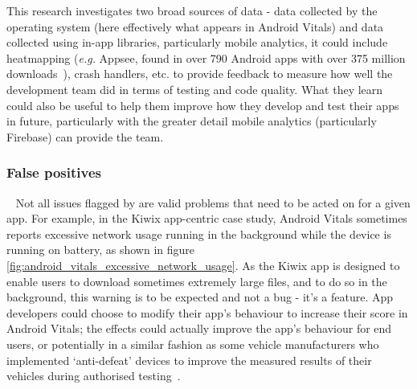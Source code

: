 This research investigates two broad sources of data - data collected by the operating system (here effectively what appears in Android Vitals) and data collected using in-app libraries, particularly mobile analytics, it could include heatmapping (\emph{e.g.} Appsee, found in over 790 Android apps with over 375 million downloads~), crash handlers, etc. to provide feedback to measure how well the development team did in terms of testing and code quality. What they learn could also be useful to help them improve how they develop and test their apps in future, particularly with the greater detail mobile analytics (particularly Firebase) can provide the team.

\subsubsection{False positives}~\label{tata-false-positives-topic}
Not all issues flagged by  are valid problems that need to be acted on for a given app. For example, in the Kiwix app-centric case study, Android Vitals sometimes reports excessive network usage running in the background while the device is running on battery, as shown in figure \ref{fig:android_vitals_excessive_network_usage}. As the Kiwix app is designed to enable users to download sometimes extremely large files, and to do so in the background, this warning is to be expected and not a bug - it's a feature. App developers could choose to modify their app's behaviour to increase their score in Android Vitals; the effects could actually improve the app's behaviour for end users, or potentially in a similar fashion as some vehicle manufacturers who implemented `anti-defeat' devices to improve the measured results of their vehicles during authorised testing~.


